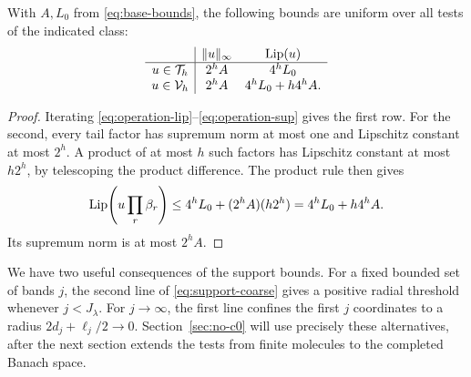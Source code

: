 \begin{lemma}\label{lem:class-bounds}
With \(A,L_0\) from \eqref{eq:base-bounds}, the following bounds are uniform over all
tests of the indicated class:
\begin{equation}
 \begin{array}{c|cc}
 &\|u\|_\infty&\operatorname{Lip}(u)\\ \hline
 u\in\mathcal T_h&2^hA&4^hL_0\\
 u\in\mathcal V_h&2^hA&4^hL_0+h4^hA.
 \end{array}                                                  \label{eq:class-bounds}
\end{equation}
\end{lemma}

\begin{proof}
Iterating \eqref{eq:operation-lip}--\eqref{eq:operation-sup}
gives the first row. For the second, every tail factor has supremum
norm at most one and Lipschitz constant at most \(2^h\). A product
of at most \(h\) such factors has Lipschitz constant at most
\(h2^h\), by telescoping the product difference. The product rule
then gives
\[
 \operatorname{Lip}\!\left(u\prod_r\beta_r\right)
 \leq4^hL_0+(2^hA)(h2^h)=4^hL_0+h4^hA.
\]
Its supremum norm is at most \(2^hA\).
\end{proof}

We have two useful consequences of the support bounds. For a fixed
bounded set of bands \(j\), the second line of
\eqref{eq:support-coarse} gives a positive radial threshold whenever
\(j<J_\lambda\). For \(j\to\infty\), the first line confines the
first \(j\) coordinates to a radius
\(2d_j+\ell_j/2\to0\). Section~\ref{sec:no-c0} will use precisely
these alternatives, after the next section extends the tests from
finite molecules to the completed Banach space.
